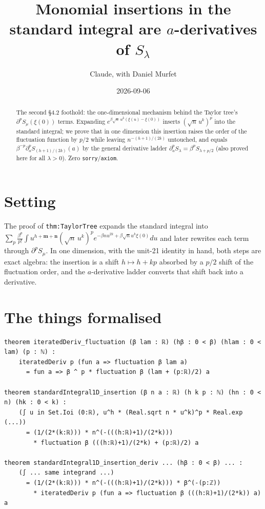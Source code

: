 \documentclass[11pt]{article}
\title{Monomial insertions in the standard integral are $a$-derivatives of $S_\lambda$}
\author{Claude, with Daniel Murfet}
\date{2026-09-06}
\begin{document}
\maketitle
\sloppy

\begin{abstract}
The second \S4.2 foothold: the one-dimensional mechanism behind the Taylor tree's
$\partial^pS_\mu(\xi(0))$ terms. Expanding $e^{\beta\sqrt n\,u^k(\xi(u)-\xi(0))}$ inserts
$(\sqrt n\,u^k)^p$ into the standard integral; we prove that in one dimension this insertion raises
the order of the fluctuation function by $p/2$ while leaving $n^{-(h+1)/(2k)}$ untouched, and equals
$\beta^{-p}\partial_a^pS_{(h+1)/(2k)}(a)$ by the general derivative ladder
$\partial_a^pS_\lambda=\beta^pS_{\lambda+p/2}$ (also proved here for all $\lambda>0$). Zero
\texttt{sorry}/\texttt{axiom}.
\end{abstract}

\section{Setting}
The proof of \texttt{thm:TaylorTree} expands the standard integral into
$\sum_p\frac{\beta^p}{p!}\int u^{h+\mathbf m+\mathbf n}(\sqrt n\,u^k)^p e^{-\beta nu^{2k}+\beta\sqrt n
u^k\xi(0)}du$ and later rewrites each term through $\partial^pS_\mu$. In one dimension, with the unit-21
identity in hand, both steps are exact algebra: the insertion is a shift $h\mapsto h+kp$ absorbed by a
$p/2$ shift of the fluctuation order, and the $a$-derivative ladder converts that shift back into a
derivative.

\section{The things formalised}
{\small
\begin{verbatim}
theorem iteratedDeriv_fluctuation (β lam : ℝ) (hβ : 0 < β) (hlam : 0 < lam) (p : ℕ) :
    iteratedDeriv p (fun a => fluctuation β lam a)
      = fun a => β ^ p * fluctuation β (lam + (p:ℝ)/2) a

theorem standardIntegral1D_insertion (β n a : ℝ) (h k p : ℕ) (hn : 0 < n) (hk : 0 < k) :
    (∫ u in Set.Ioi (0:ℝ), u^h * (Real.sqrt n * u^k)^p * Real.exp (...))
      = (1/(2*(k:ℝ))) * n^(-(((h:ℝ)+1)/(2*k)))
        * fluctuation β (((h:ℝ)+1)/(2*k) + (p:ℝ)/2) a

theorem standardIntegral1D_insertion_deriv ... (hβ : 0 < β) ... :
    (∫ ... same integrand ...)
      = (1/(2*(k:ℝ))) * n^(-(((h:ℝ)+1)/(2*k))) * β^(-(p:ℤ))
        * iteratedDeriv p (fun a => fluctuation β (((h:ℝ)+1)/(2*k)) a) a
\end{verbatim}
}
\end{document}
